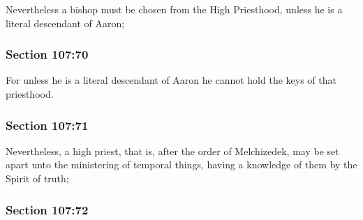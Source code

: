 		Nevertheless a bishop must be chosen from the High Priesthood, unless he is a literal descendant of Aaron;


	\subsubsection{Section 107:70} %
		\label{DC107-70}

		For unless he is a literal descendant of Aaron he cannot hold the keys of that priesthood.


	\subsubsection{Section 107:71} %
		\label{DC107-71}

		Nevertheless, a high priest, that is, after the order of Melchizedek, may be set apart unto the ministering of temporal things, having a knowledge of them by the Spirit of truth;


	\subsubsection{Section 107:72} %
		\label{DC107-72}

